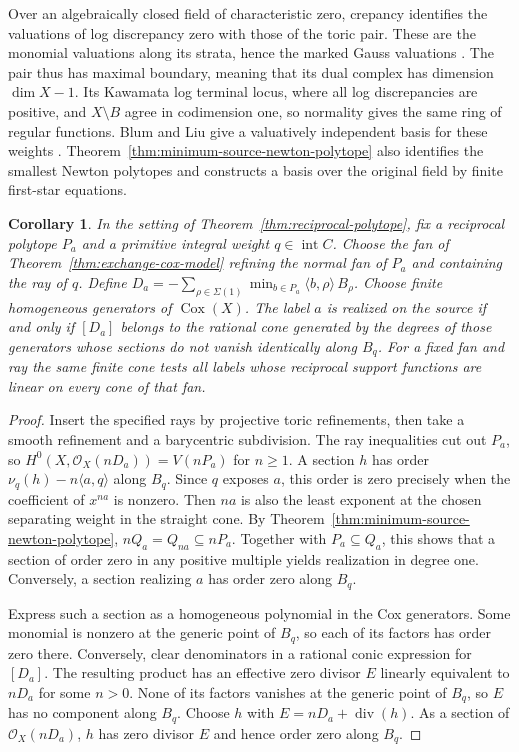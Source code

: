 \documentclass[11pt,reqno]{amsart}
\numberwithin{equation}{section}
\newtheorem{corollary}[theorem]{Corollary}
\theoremstyle{definition}
\theoremstyle{remark}
\begin{document}
Over an algebraically closed field of characteristic zero, crepancy
identifies the valuations of log discrepancy zero with those of the
toric pair. These are the monomial valuations along its strata, hence
the marked Gauss valuations \cite[Lemma~2.2]{BL}. The pair thus has
maximal boundary, meaning that its dual complex has dimension
\(\dim X-1\). Its Kawamata log terminal locus, where all log
discrepancies are positive, and \(X\setminus B\) agree in
codimension one, so normality gives the same ring of regular functions.
Blum and Liu give a valuatively independent basis for these weights
\cite[Theorem~1.2(1)]{BL}. Theorem~\ref{thm:minimum-source-newton-polytope}
also identifies the smallest Newton polytopes and constructs a basis
over the original field by finite first-star equations.

\begin{corollary}\label{cor:cox-reciprocal-face}
In the setting of Theorem~\ref{thm:reciprocal-polytope}, fix a
reciprocal polytope \(P_a\) and a primitive integral weight
\(q\in\operatorname{int}C\). Choose the fan of
Theorem~\ref{thm:exchange-cox-model} refining the normal fan of
\(P_a\) and containing the ray of \(q\). Define
\(D_a=-\sum_{\rho\in\Sigma(1)} \min_{b\in P_a}\langle b,\rho\rangle\,B_\rho\).
Choose finite homogeneous generators of \(\operatorname{Cox}(X)\).
The label \(a\) is realized on the source if and only if \([D_a]\)
belongs to the rational cone generated by the degrees of those
generators whose sections do not vanish identically along \(B_q\).
For a fixed fan and ray the same finite cone tests all labels whose
reciprocal support functions are linear on every cone of that fan.
\end{corollary}
\begin{proof}
Insert the specified rays by projective toric refinements, then take
a smooth refinement and a barycentric subdivision. The ray inequalities
cut out \(P_a\), so \(H^0(X,\mathcal O_X(nD_a))=V(nP_a)\) for \(n\ge1\).
A section \(h\) has order \(\nu_q(h)-n\langle a,q\rangle\) along \(B_q\).
Since \(q\) exposes \(a\), this order is zero precisely when the
coefficient of \(x^{na}\) is nonzero. Then \(na\) is also the least
exponent at the chosen separating weight in the straight cone.
By Theorem~\ref{thm:minimum-source-newton-polytope},
\(nQ_a=Q_{na}\subseteq nP_a\). Together with \(P_a\subseteq Q_a\),
this shows that a section of order zero in any positive multiple yields
realization in degree one. Conversely, a section realizing \(a\) has
order zero along \(B_q\).

Express such a section as a homogeneous polynomial in the Cox
generators. Some monomial is nonzero at the generic point of \(B_q\),
so each of its factors has order zero there. Conversely, clear
denominators in a rational conic expression for \([D_a]\).
The resulting product has an effective zero divisor \(E\) linearly
equivalent to \(nD_a\) for some \(n>0\). None of its factors vanishes
at the generic point of \(B_q\), so \(E\) has no component along
\(B_q\). Choose \(h\) with \(E=nD_a+\operatorname{div}(h)\).
As a section of \(\mathcal O_X(nD_a)\), \(h\) has zero divisor \(E\)
and hence order zero along \(B_q\).
\end{proof}
\end{document}
